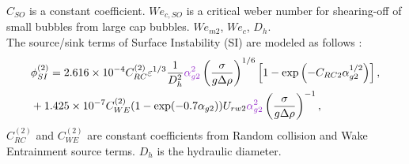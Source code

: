 $C_{SO}$ is a constant coefficient. $We_{c,SO}$ is a critical weber number for shearing-off of small bubbles from large cap bubbles. $We_{m2}$, $We_c$, $D_h$.\\
The source/sink terms of Surface Instability (SI) are modeled as follows :
 \begin{align}
 \begin{split}
 & \phi_{SI}^{(2)} = 2.616 \times 10^{-4} C_{RC}^{(2)} \varepsilon^{1/3} \frac{1}{D_h^2} {\color{mydarkorchid}\alpha_{g2}^2} \left( \frac{\sigma}{g \Delta \rho} \right)^{1/6} \left[ 1 - \exp\left( - C_{RC2} \alpha_{g2}^{1/2} \right)  \right], \\
 & + 1.425 \times 10^{-7} C_{WE}^{(2)}( 1 - \exp(-0.7 \alpha_{g2}) ) U_{rw2} {\color{mydarkorchid}\alpha_{g2}^2} \left( \frac{\sigma}{g \Delta \rho} \right)^{-1},
 \end{split}
 \end{align}
$C_{RC}^{(2)}$ and $C_{WE}^{(2)}$ are constant coefficients from Random collision and Wake Entrainment source terms. $D_h$ is the hydraulic diameter.


